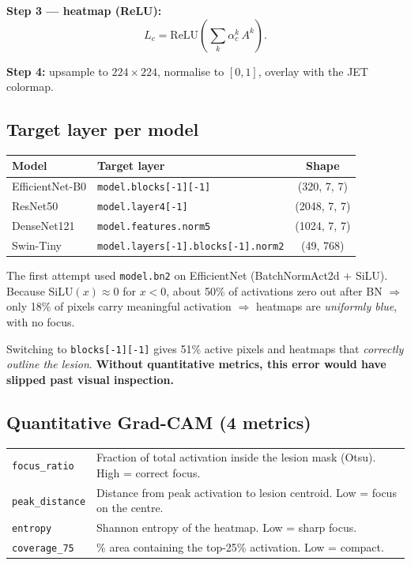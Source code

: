 \documentclass[11pt,a4paper]{article}
\begin{document}
\textbf{Step 3 --- heatmap (ReLU):}
\[
  L_c = \mathrm{ReLU}\left( \sum_k \alpha_c^k \, A^k \right).
\]

\textbf{Step 4:} upsample to $224\times 224$, normalise to $[0,1]$, overlay with the JET colormap.

\subsection{Target layer per model}

\begin{table}[h]
\centering\small
\begin{tabular}{llc}
\toprule
\textbf{Model} & \textbf{Target layer} & \textbf{Shape} \\
\midrule
EfficientNet-B0 & \texttt{model.blocks[-1][-1]}    & (320, 7, 7) \\
ResNet50        & \texttt{model.layer4[-1]}        & (2048, 7, 7) \\
DenseNet121     & \texttt{model.features.norm5}    & (1024, 7, 7) \\
Swin-Tiny       & \texttt{model.layers[-1].blocks[-1].norm2} & (49, 768) \\
\bottomrule
\end{tabular}
\end{table}

\begin{idea}
The first attempt used \texttt{model.bn2} on EfficientNet (BatchNormAct2d $+$ SiLU). Because SiLU$(x) \approx 0$ for $x < 0$, about 50\% of activations zero out after BN $\Rightarrow$ only 18\% of pixels carry meaningful activation $\Rightarrow$ heatmaps are \textit{uniformly blue}, with no focus.

Switching to \texttt{blocks[-1][-1]} gives 51\% active pixels and heatmaps that \textit{correctly outline the lesion}. \textbf{Without quantitative metrics, this error would have slipped past visual inspection.}
\end{idea}

\subsection{Quantitative Grad-CAM (4 metrics)}

\begin{table}[h]
\centering\small
\begin{tabular}{lp{8cm}}
\toprule
\texttt{focus\_ratio}      & Fraction of total activation inside the lesion mask (Otsu). High = correct focus. \\
\texttt{peak\_distance}    & Distance from peak activation to lesion centroid. Low = focus on the centre. \\
\texttt{entropy}           & Shannon entropy of the heatmap. Low = sharp focus. \\
\texttt{coverage\_75}      & \% area containing the top-25\% activation. Low = compact. \\
\bottomrule
\end{tabular}
\end{table}
\end{document}
